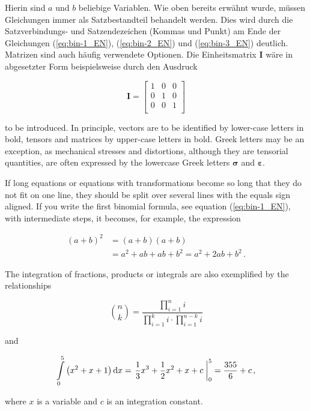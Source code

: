 Hierin sind $a$ und $b$ beliebige Variablen. Wie oben bereits erwähnt wurde, müssen Gleichungen immer als Satzbestandteil behandelt werden. Dies wird durch die Satzverbindungs- und Satzendezeichen (Kommas und Punkt) am Ende der Gleichungen (\ref{eq:bin-1_EN}), (\ref{eq:bin-2_EN}) und (\ref{eq:bin-3_EN}) deutlich. Matrizen sind auch häufig verwendete Optionen. Die Einheitsmatrix $\mathbf{I}$ wäre in abgesetzter Form beispielsweise durch den Ausdruck


\begin{equation}
	\mathbf{I} = 
	\left[ \begin{matrix}
		1 & 0 & 0 \\
		0 & 1 & 0 \\
		0 & 0 & 1 \\
	\end{matrix} \right]
\end{equation}




to be introduced. In principle, vectors are to be identified by lower-case letters in bold, tensors and matrices by upper-case letters in bold. Greek letters may be an exception, as mechanical stresses and distortions, although they are tensorial quantities, are often expressed by the lowercase Greek letters $\boldsymbol{\sigma}$ and $\boldsymbol{\varepsilon}$.

If long equations or equations with transformations become so long that they do not fit on one line, they should be split over several lines with the equals sign aligned. If you write the first binomial formula, see equation (\ref{eq:bin-1_EN}), with intermediate steps, it becomes, for example, the expression

\begin{equation}
	\begin{split}
		(a+b)^2 &= (a+b)(a+b)\\
		&= a^2 + ab + ab + b^2 = a^2 + 2ab + b^2 \,.
	\end{split}
\end{equation}

The integration of fractions, products or integrals are also exemplified by the relationships

\begin{equation}
	\binom{n}{k} = \frac{\displaystyle\prod_{i=1}^n i}{\displaystyle\prod_{i=1}^k i\cdot
		\prod_{i=1}^{n-k} i}
\end{equation}


and


\begin{equation}
	\int_0^5\limits \left(x^2 +x+1\right) \mathrm{d}x = \left. \frac{1}{3} x^3 + \frac{1}{2} x^2 + x + c \; \right|_0^5 = \frac{355}{6} + c \, ,
\end{equation}

where $x$ is a variable and $c$ is an integration constant.








